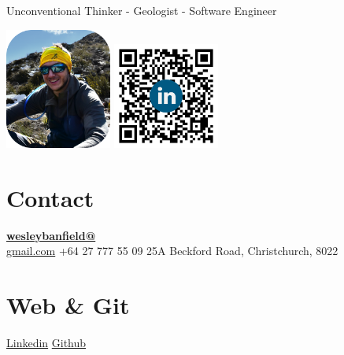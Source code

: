 \documentclass[]{friggeri-cv}
\begin{document}
      {\hspace{5.05cm}Unconventional Thinker - Geologist - Software Engineer}
      

\begin{aside}
  \includegraphics[width=3.5cm]{img/profile_relaxed.png}
  \includegraphics[width=3.5cm]{img/QR.png}
  \section{Contact}
    \href{mailto:wesleybanfield@gmail.com}{\textbf{wesleybanfield@}\\gmail.com}\vspace{3pt}
    +64 27 777 55 09\vspace{3pt}
    25A Beckford Road,
    Christchurch, 8022
  \section{Web \& Git}
    \href{https://www.linkedin.com/in/wesleybanfield/}{Linkedin}
    \href{https://github.com/WesleyTheGeolien}{Github}

\end{aside}
\end{document}
